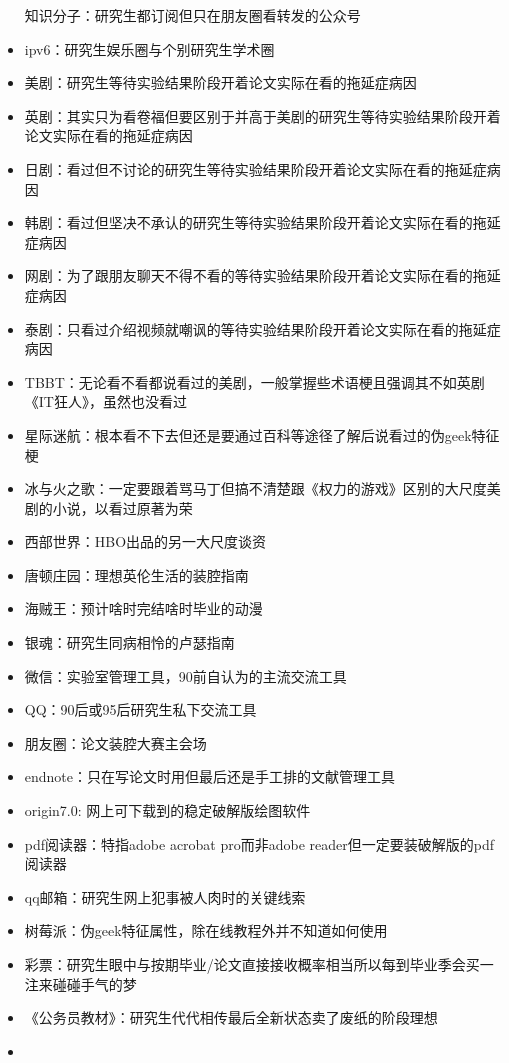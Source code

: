 \documentclass[]{tufte-book}
\begin{document}
\begin{itemize}
  知识分子：研究生都订阅但只在朋友圈看转发的公众号
\item
  ipv6：研究生娱乐圈与个别研究生学术圈
\item
  美剧：研究生等待实验结果阶段开着论文实际在看的拖延症病因
\item
  英剧：其实只为看卷福但要区别于并高于美剧的研究生等待实验结果阶段开着论文实际在看的拖延症病因
\item
  日剧：看过但不讨论的研究生等待实验结果阶段开着论文实际在看的拖延症病因
\item
  韩剧：看过但坚决不承认的研究生等待实验结果阶段开着论文实际在看的拖延症病因
\item
  网剧：为了跟朋友聊天不得不看的等待实验结果阶段开着论文实际在看的拖延症病因
\item
  泰剧：只看过介绍视频就嘲讽的等待实验结果阶段开着论文实际在看的拖延症病因
\item
  TBBT：无论看不看都说看过的美剧，一般掌握些术语梗且强调其不如英剧《IT狂人》，虽然也没看过
\item
  星际迷航：根本看不下去但还是要通过百科等途径了解后说看过的伪geek特征梗
\item
  冰与火之歌：一定要跟着骂马丁但搞不清楚跟《权力的游戏》区别的大尺度美剧的小说，以看过原著为荣
\item
  西部世界：HBO出品的另一大尺度谈资
\item
  唐顿庄园：理想英伦生活的装腔指南
\item
  海贼王：预计啥时完结啥时毕业的动漫
\item
  银魂：研究生同病相怜的卢瑟指南
\item
  微信：实验室管理工具，90前自认为的主流交流工具
\item
  QQ：90后或95后研究生私下交流工具
\item
  朋友圈：论文装腔大赛主会场
\item
  endnote：只在写论文时用但最后还是手工排的文献管理工具
\item
  origin7.0: 网上可下载到的稳定破解版绘图软件
\item
  pdf阅读器：特指adobe acrobat pro而非adobe reader但一定要装破解版的pdf阅读器
\item
  qq邮箱：研究生网上犯事被人肉时的关键线索
\item
  树莓派：伪geek特征属性，除在线教程外并不知道如何使用
\item
  彩票：研究生眼中与按期毕业/论文直接接收概率相当所以每到毕业季会买一注来碰碰手气的梦
\item
  《公务员教材》：研究生代代相传最后全新状态卖了废纸的阶段理想
\item

\end{itemize}
\end{document}
